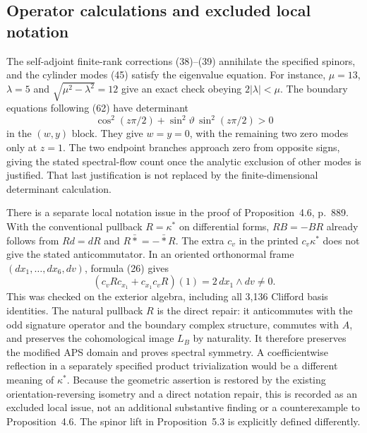 \documentclass[10pt]{article}
\begin{document}
\subsection*{Operator calculations and excluded local notation}
The self-adjoint finite-rank corrections (38)–(39) annihilate the specified spinors, and the cylinder modes (45) satisfy the eigenvalue equation. For instance, \(\mu=13\), \(\lambda=5\) and \(\sqrt{\mu^2-\lambda^2}=12\) give an exact check obeying \(2|\lambda|<\mu\). The boundary equations following (62) have determinant \[\cos^2(z\pi/2)+\sin^2\vartheta\,\sin^2(z\pi/2)>0\] in the \((w,y)\) block. They give \(w=y=0\), with the remaining two zero modes only at \(z=1\). The two endpoint branches approach zero from opposite signs, giving the stated spectral-flow count once the analytic exclusion of other modes is justified. That last justification is not replaced by the finite-dimensional determinant calculation.\par
There is a separate local notation issue in the proof of Proposition 4.6, p. 889. With the conventional pullback \(R=\kappa^*\) on differential forms, \(RB=-BR\) already follows from \(R d=dR\) and \(R\bar *=-\bar *R\). The extra \(c_v\) in the printed \(c_v\kappa^*\) does not give the stated anticommutator. In an oriented orthonormal frame \((dx_1,\ldots,dx_6,dv)\), formula (26) gives \[(c_vR c_{x_1}+c_{x_1}c_vR)(1)=2\,dx_1\wedge dv\ne0.\] This was checked on the exterior algebra, including all 3,136 Clifford basis identities. The natural pullback \(R\) is the direct repair: it anticommutes with the odd signature operator and the boundary complex structure, commutes with \(A\), and preserves the cohomological image \(L_B\) by naturality. It therefore preserves the modified APS domain and proves spectral symmetry. A coefficientwise reflection in a separately specified product trivialization would be a different meaning of \(\kappa^*\). Because the geometric assertion is restored by the existing orientation-reversing isometry and a direct notation repair, this is recorded as an excluded local issue, not an additional substantive finding or a counterexample to Proposition 4.6. The spinor lift in Proposition 5.3 is explicitly defined differently.\par
\end{document}
